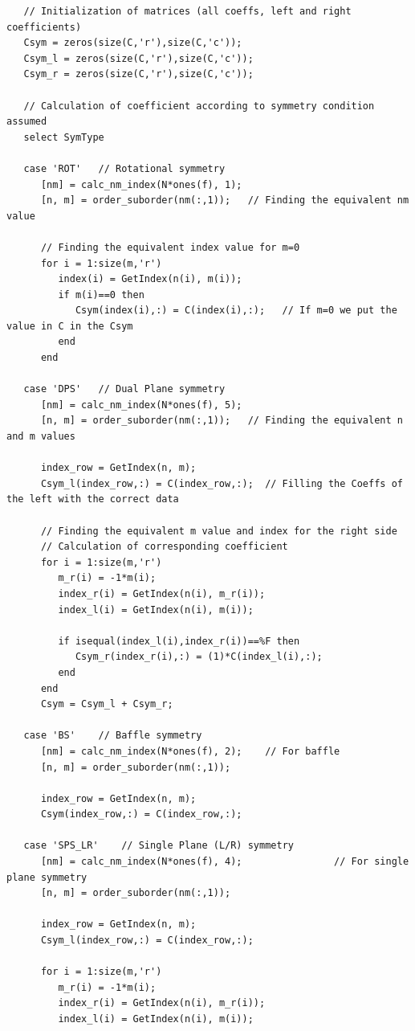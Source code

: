 \documentclass{report}
\begin{document}
\begin{appendices}
\begin{lstlisting}
   // Initialization of matrices (all coeffs, left and right coefficients)
   Csym = zeros(size(C,'r'),size(C,'c'));
   Csym_l = zeros(size(C,'r'),size(C,'c'));  
   Csym_r = zeros(size(C,'r'),size(C,'c'));
   
   // Calculation of coefficient according to symmetry condition assumed
   select SymType
   
   case 'ROT' 	// Rotational symmetry
      [nm] = calc_nm_index(N*ones(f), 1);                      
      [n, m] = order_suborder(nm(:,1));   // Finding the equivalent nm value 
      
      // Finding the equivalent index value for m=0
      for i = 1:size(m,'r')
         index(i) = GetIndex(n(i), m(i));
         if m(i)==0 then
            Csym(index(i),:) = C(index(i),:);   // If m=0 we put the value in C in the Csym
         end
      end
      
   case 'DPS'	// Dual Plane symmetry
      [nm] = calc_nm_index(N*ones(f), 5);                
      [n, m] = order_suborder(nm(:,1));   // Finding the equivalent n and m values
      
      index_row = GetIndex(n, m);
      Csym_l(index_row,:) = C(index_row,:);  // Filling the Coeffs of the left with the correct data
      
      // Finding the equivalent m value and index for the right side
      // Calculation of corresponding coefficient
      for i = 1:size(m,'r')
         m_r(i) = -1*m(i);
         index_r(i) = GetIndex(n(i), m_r(i));
         index_l(i) = GetIndex(n(i), m(i));
         
         if isequal(index_l(i),index_r(i))==%F then
            Csym_r(index_r(i),:) = (1)*C(index_l(i),:);
         end
      end
      Csym = Csym_l + Csym_r; 
      
   case 'BS'	// Baffle symmetry
      [nm] = calc_nm_index(N*ones(f), 2);    // For baffle
      [n, m] = order_suborder(nm(:,1));   
      
      index_row = GetIndex(n, m);                 
      Csym(index_row,:) = C(index_row,:); 
      
   case 'SPS_LR'	// Single Plane (L/R) symmetry
      [nm] = calc_nm_index(N*ones(f), 4);                // For single plane symmetry
      [n, m] = order_suborder(nm(:,1));   
      
      index_row = GetIndex(n, m);
      Csym_l(index_row,:) = C(index_row,:); 
      
      for i = 1:size(m,'r')
         m_r(i) = -1*m(i);
         index_r(i) = GetIndex(n(i), m_r(i));
         index_l(i) = GetIndex(n(i), m(i));
         

\end{lstlisting}
\end{appendices}
\end{document}
